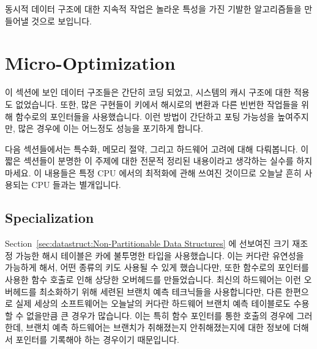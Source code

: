 동시적 데이터 구조에 대한 지속적 작업은 놀라운 특성을 가진 기발한 알고리즘들을
만들어낼 것으로 보입니다.

\section{Micro-Optimization}
\label{sec:datastruct:Micro-Optimization}

이 섹션에 보인 데이터 구조들은 간단히 코딩 되었고, 시스템의 캐시 구조에 대한
적용도 없었습니다.
또한, 많은 구현들이 키에서 해시로의 변환과 다른 빈번한 작업들을 위해 함수로의
포인터들을 사용했습니다.
이런 방법이 간단하고 포팅 가능성을 높여주지만, 많은 경우에 이는 어느정도 성능을
포기하게 합니다.

다음 섹션들에서는 특수화, 메모리 절약, 그리고 하드웨어 고려에 대해 다뤄봅니다.
이 짧은 섹션들이 분명한 이 주제에 대한 전문적 정리된 내용이라고 생각하는 실수를
하지 마세요.
이 내용들은 특정 CPU 에서의 최적화에 관해 쓰여진 것이므로 오늘날 흔히 사용되는
CPU 들과는 별개입니다.

\subsection{Specialization}
\label{sec:datastruct:Specialization}

Section~\ref{sec:datastruct:Non-Partitionable Data Structures}
에 선보여진 크기 재조정 가능한 해시 테이블은 카에 불투명한 타입을 사용했습니다.
이는 커다란 유연성을 가능하게 해서, 어떤 종류의 키도 사용될 수 있게 했습니다만,
또한 함수로의 포인터를 사용한 함수 호출로 인해 상당한 오버헤드를 만들었습니다.
최신의 하드웨어는 이런 오버헤드를 최소화하기 위해 세련된 브랜치 예측 테크닉들을
사용합니다만, 다른 한편으로 실제 세상의 소프트웨어는 오늘날의 커다란 하드웨어
브랜치 예측 테이블로도 수용할 수 없을만큼 큰 경우가 많습니다.
이는 특히 함수 포인터를 통한 호출의 경우에 그러한데, 브랜치 예측 하드웨어는
브랜치가 취해졌는지 안취해졌는지에 대한 정보에 더해서 포인터를 기록해야 하는
경우이기 때문입니다.
\iffalse

